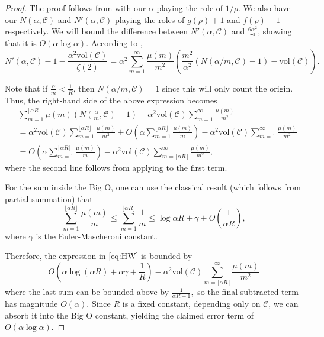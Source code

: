 \documentclass[12pt]{amsart}
\theoremstyle{plain}
\begin{document}
\begin{proof} The proof follows from \cite[Theorem 459]{hardywright} with our $\alpha$ playing the role of $1/\rho$. We also have our $N(\alpha,\mathcal{C})$ and $N'(\alpha,\mathcal{C})$ playing the roles of $g(\rho)+1$ and $f(\rho)+1$ respectively. We will bound the difference between $N'(\alpha, \mathcal{C})$ and $\frac{6 \alpha^2}{\pi^2}$, showing that it is $O(\alpha \log \alpha)$. According to \cite[24.10.8]{hardywright},
\begin{equation} \label{eq:HW}
    N'(\alpha,\mathcal{C})-1-\frac{\alpha^2 \mathrm{vol}(\mathcal{C})}{\zeta(2)} 
= \alpha^2 \sum_{m=1}^\infty \frac{\mu(m)}{m^2}\left( \frac{m^2}{\alpha^2} \left(N({\alpha/m},\mathcal{C})-1\right)-\mathrm{vol}(\mathcal{C})\right). 
\end{equation} 

Note that if $\frac{\alpha}{m}<\frac{1}{R}$, then $N(\alpha/m,\mathcal{C})=1$ since this will only count the origin. Thus, the right-hand side of the above expression becomes
\begin{align*} &\sum_{m = 1}^{\lfloor\alpha R\rfloor} \mu(m)\left(N\left(\frac{\alpha}{m}, \mathcal{C}\right) - 1\right) - \alpha^2 \mathrm{vol}(\mathcal{C}) \sum_{m = 1}^\infty \frac{\mu(m)}{m^2}\\ & = \alpha^2 \mathrm{vol}(\mathcal{C}) \sum_{m=1}^{\lfloor \alpha R \rfloor} \frac{\mu(m)}{m^2} + O\left(\alpha \sum_{m = 1}^{\lfloor \alpha R \rfloor} \frac{\mu(m)}{m}\right) - \alpha^2 \mathrm{vol}(\mathcal{C}) \sum_{m=1}^\infty \frac{\mu(m)}{m^2} 
\\ & =  O\left(\alpha \sum_{m = 1}^{\lfloor \alpha R \rfloor} \frac{\mu(m)}{m}\right) - \alpha^2 \mathrm{vol}(\mathcal{C}) \sum_{m=\lceil \alpha R \rceil}^\infty \frac{\mu(m)}{m^2} ,
\end{align*} where the second line follows from applying  to the first term.


For the sum inside the Big O, one can use the classical result (which follows from partial summation) that
\[ \sum_{m = 1}^{\lfloor \alpha R \rfloor} \frac{\mu(m)}{m} \leq \sum_{m = 1}^{\lfloor \alpha R \rfloor} \frac{1}{m} \leq \log \alpha R + \gamma + O\left(\frac{1}{\alpha R}\right),\] where $\gamma$ is the Euler-Mascheroni constant. 

Therefore, the expression in \eqref{eq:HW} is bounded by 
\[ O\left(\alpha \log (\alpha R) + \alpha \gamma + \frac{1}{R}\right) -\alpha^2 \mathrm{vol}(\mathcal{C}) \sum_{m = \lceil \alpha R \rceil}^\infty \frac{\mu(m)}{m^2} \]
where the last sum can be bounded above by $\frac{1}{\alpha R - 1},$ so the final subtracted term has magnitude $O(\alpha)$. Since $R$ is a fixed constant, depending only on $\mathcal{C}$, we can absorb it into the Big O constant, yielding the claimed error term of $O(\alpha \log \alpha).$ 




\end{proof}
\end{document}
